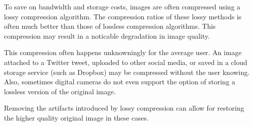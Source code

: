 To save on bandwidth and storage costs, images are often compressed using a lossy compression algorithm. The compression ratios of these lossy methods is often much better than those of lossless compression algorithms. This compression may result in a noticable degradation in image quality.

This compression often happens unknowningly for the average user. An image attached to a Twitter tweet, uploaded to other social media, or saved in a cloud storage service (such as Dropbox) may be compressed without the user knowing. Also, sometimes digital cameras do not even support the option of storing a lossless version of the original image. 

Removing the artifacts introduced by lossy compression can allow for restoring the higher quality original image in these cases.